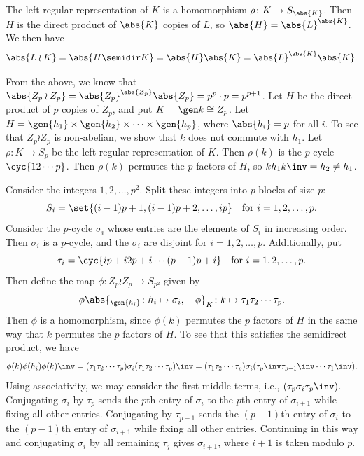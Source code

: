 \begin{solenum}
    \item The left regular representation of $K$ is a homomorphism $\rho \colon K \to S_{\abs{K}}$.
    Then $H$ is the direct product of $\abs{K}$ copies of $L$, so $\abs{H} = \abs{L}^{\abs{K}}$.
    We then have
    \[
        \abs{L \wr K} = \abs{H \semidir K} = \abs{H}\abs{K} = \abs{L}^{\abs{K}}\abs{K}.
    \]
    \item From the above, we know that $\abs{Z_p \wr Z_p} = \abs{Z_p}^{\abs{Z_p}}\abs{Z_p} = p^p \cdot p = p^{p + 1}$.
    Let $H$ be the direct product of $p$ copies of $Z_p$, and put $K = \gen k \cong Z_p$.
    Let $H = \gen{h_1} \times \gen{h_2} \times \cdots \times \gen{h_p}$, where $\abs{h_i} = p$ for all $i$.
    To see that $Z_p \wr Z_p$ is non-abelian, we show that $k$ does not commute with $h_1$.
    Let $\rho \colon K \to S_p$ be the left regular representation of $K$.
    Then $\rho(k)$ is the $p$-cycle $\cyc{1 2 \cdots p}$.
    Then $\rho(k)$ permutes the $p$ factors of $H$, so $kh_1k\inv = h_2 \neq h_1$.

    Consider the integers $1, 2, \ldots, p^2$.
    Split these integers into $p$ blocks of size $p$:
    \[
        S_i = \set{(i - 1)p + 1, (i - 1)p + 2, \ldots, ip} \quad \text{for}~ i = 1, 2, \ldots, p.
    \]
    Consider the $p$-cycle $\sigma_i$ whose entries are the elements of $S_i$ in increasing order.
    Then $\sigma_i$ is a $p$-cycle, and the $\sigma_i$ are disjoint for $i = 1, 2, \ldots, p$.
    Additionally, put
    \[
        \tau_i = \cyc{i {p + i} {2p + i} \cdots {(p - 1)p + i}} \quad \text{for}~ i = 1, 2, \ldots, p.
    \]
    Then define the map $\phi \colon Z_p \wr Z_p \to S_{p^2}$ given by
    \[
        \phi\abs{_{\gen{h_i}} \colon h_i \mapsto \sigma_i, \quad \phi}_K \colon k \mapsto \tau_1 \tau_2 \cdots \tau_p.
    \]
    Then $\phi$ is a homomorphism, since $\phi(k)$ permutes the $p$ factors of $H$ in the same way that $k$ permutes the $p$ factors of $H$.
    To see that this satisfies the semidirect product, we have
    \[
        \phi(k)\phi(h_i)\phi(k)\inv = (\tau_1 \tau_2 \cdots \tau_p)\sigma_i(\tau_1 \tau_2 \cdots \tau_p)\inv = (\tau_1 \tau_2 \cdots \tau_p)\sigma_i(\tau_p\inv \tau_{p - 1}\inv \cdots \tau_1\inv).
    \]
    Using associativity, we may consider the first middle terms, i.e., $(\tau_p \sigma_i \tau_p\inv)$.
    Conjugating $\sigma_i$ by $\tau_p$ sends the $p$th entry of $\sigma_i$ to the $p$th entry of $\sigma_{i + 1}$ while fixing all other entries.
    Conjugating by $\tau_{p - 1}$ sends the $(p - 1)$th entry of $\sigma_i$ to the $(p - 1)$th entry of $\sigma_{i + 1}$ while fixing all other entries.
    Continuing in this way and conjugating $\sigma_i$ by all remaining $\tau_j$ gives $\sigma_{i + 1}$, where $i + 1$ is taken modulo $p$.


\end{solenum}

